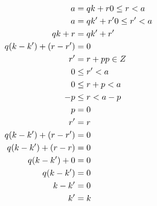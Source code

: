 \documentclass{article}
\begin{document}
	\begin{align}
	a & = qk + r \space 0 \le r < a \\
	a & = qk' + r' \space 0 \le r' < a \\
	qk + r & = qk' + r' \\
	q(k - k') + (r - r') & = 0 \\
	r' & = r + p \space p \in Z \\
	0 & \le r' < a \\
	0 & \le r + p < a \\
	-p & \le r < a - p \\
	p & = 0 \\
	r' & = r \\
	q(k - k') + (r - r') & = 0 \\
	q(k - k') + (r - r) & = 0 \\
	q(k - k') + 0 & = 0 \\
	q(k - k') & = 0 \\
	k - k' & = 0 \\
	k' & = k
	\end{align}
\end{document}
